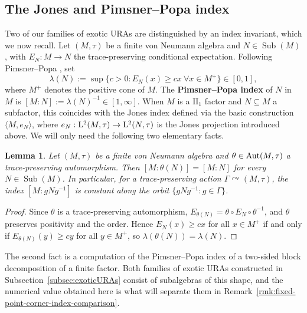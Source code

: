 \documentclass[12pt]{amsart} %
\theoremstyle{plain}
\newtheorem{lemma}[theorem]{Lemma}
\theoremstyle{definition}
\newcommand{\LL}{{\rm L}}
\newcommand{\Aut}{{\rm Aut}}
\DeclareMathOperator{\Sub}{Sub}
\begin{document}
\subsection{The Jones and Pimsner--Popa index}
Two of our families of exotic URAs are distinguished by an index invariant, which
we now recall. Let $(M,\tau)$ be a finite von Neumann algebra and
$N\in\Sub(M)$, with $E_N:M\to N$ the trace-preserving conditional expectation.
Following Pimsner--Popa \cite{pimsnerpopa}, set
$$
        \lambda(N):=\sup\{c>0:E_N(x)\geq cx\ \forall x\in M^+\}
        \in[0,1],
$$
where $M^+$ denotes the positive cone of $M$. The \textbf{Pimsner--Popa index}
of $N$ in $M$ is $[M:N]:=\lambda(N)^{-1}\in[1,\infty]$. When $M$ is a $\mathrm{II}_1$ factor and $N\subseteq M$ a subfactor, this
coincides with the Jones index \cite{jones1983index} defined via the basic
construction $\langle M,e_N\rangle$, where $e_N:\LL^2(M,\tau)\to \LL^2(N,\tau)$ is the Jones projection introduced above. We will only need the following two elementary facts.
\begin{lemma}\label{lem:index-conjugation-invariant}
Let $(M,\tau)$ be a finite von Neumann algebra and $\theta\in\Aut(M,\tau)$ a
trace-preserving automorphism. Then $[M:\theta(N)]=[M:N]$ for every
$N\in\Sub(M)$. In particular, for a trace-preserving action
$\Gamma\curvearrowright(M,\tau)$, the index $[M:gNg^{-1}]$ is constant along the
orbit $\{gNg^{-1}:g\in\Gamma\}$.
\end{lemma}
\begin{proof}
Since $\theta$ is a trace-preserving automorphism, $E_{\theta(N)}=\theta\circ
E_N\circ\theta^{-1}$, and $\theta$ preserves positivity and the order. Hence
$E_N(x)\geq cx$ for all $x\in M^+$ if and only if $E_{\theta(N)}(y)\geq cy$ for
all $y\in M^+$, so $\lambda(\theta(N))=\lambda(N)$.
\end{proof}

\noindent The second fact is a computation of the Pimsner--Popa index of a
two-sided block decomposition of a finite factor. Both families of exotic URAs
constructed in Subsection~\ref{subsec:exoticURAs} consist of subalgebras of this
shape, and the numerical value obtained here is what will separate them in
Remark~\ref{rmk:fixed-point-corner-index-comparison}.
\medskip
\end{document}
